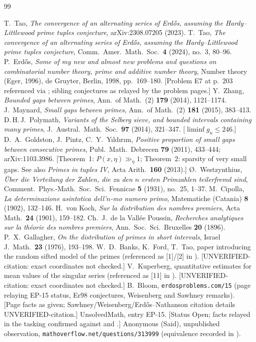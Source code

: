 \documentclass[11pt]{article}
\theoremstyle{definition}
\begin{document}
\begin{thebibliography}{99}\small
\raggedright

 T.~Tao, \emph{The convergence of an alternating series of Erd\H{o}s, assuming the Hardy--Littlewood prime tuples conjecture}, arXiv:2308.07205 (2023).
 T.~Tao, \emph{The convergence of an alternating series of Erd\H{o}s, assuming the Hardy--Littlewood prime tuples conjecture}, Comm.\ Amer.\ Math.\ Soc.\ \textbf{4} (2024), no.~3, 80--96.
 P.~Erd\H{o}s, \emph{Some of my new and almost new problems and questions on combinatorial number theory, prime and additive number theory}, Number theory (Eger, 1996), de Gruyter, Berlin, 1998, pp.~169--180. [Problem E7 at p.~203 referenced via \cite{Ta23}; sibling conjectures as relayed by the problem pages.]
 Y.~Zhang, \emph{Bounded gaps between primes}, Ann.\ of Math.\ (2) \textbf{179} (2014), 1121--1174.
 J.~Maynard, \emph{Small gaps between primes}, Ann.\ of Math.\ (2) \textbf{181} (2015), 383--413.
 D.\,H.\,J.~Polymath, \emph{Variants of the Selberg sieve, and bounded intervals containing many primes}, J.\ Austral.\ Math.\ Soc.\ \textbf{97} (2014), 321--347. [$\liminf g_n\le246$.]
 D.~A.~Goldston, J.~Pintz, C.~Y.~Y{\i}ld{\i}r{\i}m, \emph{Positive proportion of small gaps between consecutive primes}, Publ.\ Math.\ Debrecen \textbf{79} (2011), 433--444; arXiv:1103.3986. [Theorem~1: $P(x,\eta)\gg_\eta1$; Theorem~2: sparsity of very small gaps. See also \emph{Primes in tuples IV}, Acta Arith.\ \textbf{160} (2013).]
 \O{}.~Westzynthius, \emph{\"{U}ber die Verteilung der Zahlen, die zu den $n$ ersten Primzahlen teilerfremd sind}, Comment.\ Phys.-Math.\ Soc.\ Sci.\ Fennicae \textbf{5} (1931), no.~25, 1--37.
 M.~Cipolla, \emph{La determinazione asintotica dell'$n$-mo numero primo}, Matematiche (Catania) \textbf{8} (1902), 132--146.
 H.~von Koch, \emph{Sur la distribution des nombres premiers}, Acta Math.\ \textbf{24} (1901), 159--182.
 Ch.~J.~de la Vall\'ee Poussin, \emph{Recherches analytiques sur la th\'eorie des nombres premiers}, Ann.\ Soc.\ Sci.\ Bruxelles \textbf{20} (1896).
 P.~X.~Gallagher, \emph{On the distribution of primes in short intervals}, Israel J.\ Math.\ \textbf{23} (1976), 193--198.
 W.~D.~Banks, K.~Ford, T.~Tao, paper introducing the random sifted model of the primes (referenced as [1]/[2] in \cite{Ta23}). [UNVERIFIED-citation: exact coordinates not checked.]
 V.~Kuperberg, quantitative estimates for mean values of the singular series (referenced as [11] in \cite{Ta23}). [UNVERIFIED-citation: exact coordinates not checked.]
 B.~Bloom, \texttt{erdosproblems.com/15} (page relaying EP-15 status, Er98 conjectures, Weisenberg and Sawhney remarks). [Page facts as given; Sawhney/Weisenberg/Erd\H{o}s--Nathanson citation details UNVERIFIED-citation.]
 UnsolvedMath, entry EP-15. [Status Open; facts relayed in the tasking confirmed against \cite{Ta23} and \cite{GPY11}.]
 Anonymous (Said), unpublished observation, \texttt{mathoverflow.net/questions/313999} (equivalence recorded in \cite[Tao, footnote~3]{Ta23}).

\end{thebibliography}
\end{document}
